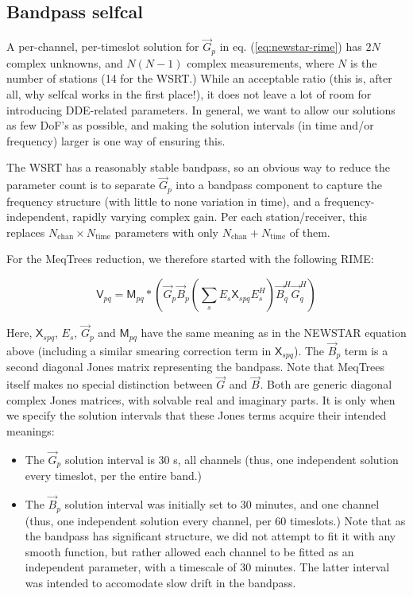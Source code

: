 \documentclass[]{aa}
\newcommand{\herm}{H}
\newcommand{\jones}[2]{\vec {#1}_{#2}}
\newcommand{\jonesT}[2]{\vec {#1}^{\herm}_{#2}}
\newcommand{\coh}[2]{\mathsf{{#1}}_{{#2}}}
\begin{document}
\subsection{Bandpass selfcal}

A per-channel, per-timeslot solution for $\jones{G}{p}$ in eq. (\ref{eq:newstar-rime}) has $2N$ complex unknowns, and $N(N-1)$ complex measurements, where $N$ is the number of stations (14 for the WSRT.) While an acceptable ratio (this is, after all, why selfcal works in the first place!), it does not leave a lot of room for introducing DDE-related parameters. In general, we want to allow our solutions as few DoF's as possible, and making the solution intervals (in time and/or frequency) larger is one way of ensuring this.

The WSRT has a reasonably stable bandpass, so an obvious way to reduce the parameter count is to separate $\jones{G}{p}$ into a bandpass component to capture the frequency structure (with little to none variation in time), and a frequency-independent, rapidly varying complex gain. Per each station/receiver, this replaces $N_\mathrm{chan}\times N_\mathrm{time}$ parameters with only $N_\mathrm{chan}+N_\mathrm{time}$ of them.

For the MeqTrees reduction, we therefore started with the following RIME:

\begin{equation}\label{eq:3C147:bandpass}
\coh{V}{pq} = \coh{M}{pq} \ast \left ( \jones{G}{p} \jones{B}{p} \left( \sum_s E_s \coh{X}{spq} E^{\herm}_s \right)  \jonesT{B}{q} \jonesT{G}{q} \right )
\end{equation}

Here, $\coh{X}{spq}$, $E_s$, $\jones{G}{p}$ and $\coh{M}{pq}$ have the same meaning as in the NEWSTAR equation above (including a similar smearing correction term in $\coh{X}{spq}$). The $\jones{B}{p}$ term is a second diagonal Jones matrix representing the bandpass. Note that MeqTrees itself makes no special distinction between $\jones{G}{}$ and $\jones{B}{}$. Both are generic diagonal complex Jones matrices, with solvable real and imaginary parts. It is only when we specify the solution intervals that these Jones terms acquire their intended meanings:

\begin{itemize}
\item The $\jones{G}{p}$ solution interval is 30 s, all channels (thus, one independent solution every timeslot, per the entire band.)
\item The $\jones{B}{p}$ solution interval was initially set to 30 minutes, and one channel (thus, one independent solution every channel, per 60 timeslots.) Note that as the bandpass has significant structure, we did not attempt to fit it with any smooth function, but rather allowed each channel to be fitted as an independent parameter, with a timescale of 30 minutes. The latter interval was intended to accomodate slow drift in the bandpass.
\end{itemize}
\end{document}
